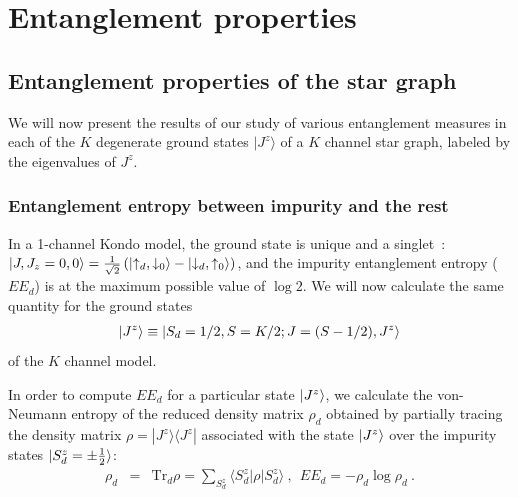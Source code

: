 \documentclass[reprint,prb,superscriptaddress]{revtex4-2}
\begin{document}
\section{Entanglement properties}
\label{sec:ent_prop}

\subsection{Entanglement properties of the star graph}
\label{sec:EE_star graph}

We will now present the results of our study of various entanglement measures in each of the $K$ degenerate ground states $|J^z\rangle$ of a $K$ channel star graph, labeled by the eigenvalues of $J^z$.
\subsubsection{Entanglement entropy between impurity and the rest}
In a 1-channel Kondo model, the ground state is unique and a singlet~\cite{wilson1975renormalization}: \(\ket{J,J_z=0,0} = \frac{1}{\sqrt{2}} \left(\ket{\uparrow_{d},\downarrow_0} - \ket{\downarrow_d, \uparrow_0}\right)\), and the impurity entanglement entropy ($EE_d$) is at the  maximum possible value of $\log 2$.
We will now calculate the same quantity for the ground states 
\begin{equation}\begin{aligned}
\ket{J^z} \equiv \ket{S_d=1/2,S=K/2;J=(S-1/2),J^z}
\end{aligned}\end{equation}
of the $K$ channel model.

In order to compute \(EE_d\) for a particular state \(\ket{J^z}\), we calculate the von-Neumann entropy of the reduced density matrix \(\rho_d\) obtained by partially tracing the density matrix $\rho=|J^z\rangle\langle J^z|$ associated with the state \(\ket{J^z}\) over the impurity states \(\ket{S_d^z = \pm \frac{1}{2}}\): 
\begin{eqnarray}
\rho_{d}&=& \textrm{Tr}_{d} \rho=\sum_{S_d^z} \langle S_d^z| \rho | S^z_d\rangle ~,~~EE_d = -\rho_{d} \log \rho_{d}~.
\end{eqnarray}
\end{document}
